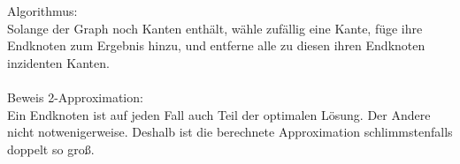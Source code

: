 Algorithmus:\\
Solange der Graph noch Kanten enthält, wähle zufällig eine Kante, füge ihre Endknoten zum Ergebnis hinzu, und entferne alle zu diesen ihren Endknoten inzidenten Kanten.\\ \ \\
Beweis 2-Approximation:\\
Ein Endknoten ist auf jeden Fall auch Teil der optimalen Lösung. Der Andere nicht notwenigerweise. Deshalb ist die berechnete Approximation schlimmstenfalls doppelt so groß.